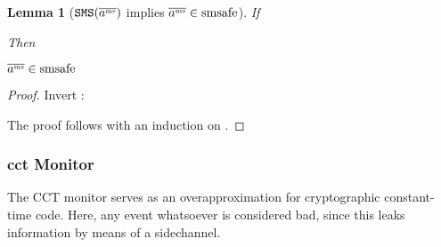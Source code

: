 \documentclass[a4paper,names,dvipsnames]{article}
\newtheorem{lemma}{Lemma}
\begin{document}
\begin{lemma}[$\texttt{SMS}(\overline{a^{\text{\tiny ms}}})$ implies $\overline{a^{\text{\tiny ms}}}\in\operatorname{smsafe}$]\label{lem:smssafe-tracesms}
  If
  Then
  \begin{goals}
    \item $\overline{a^{\text{\tiny ms}}}\in\operatorname{smsafe}$
  \end{goals}
\end{lemma}
\begin{proof}
  Invert :
  The proof follows with an induction on .
\end{proof}

\subsubsection{\gls*{cct} Monitor}
The CCT monitor serves as an overapproximation for cryptographic constant-time code.
Here, any event whatsoever is considered bad, since this leaks information by means of a sidechannel.
\end{document}
